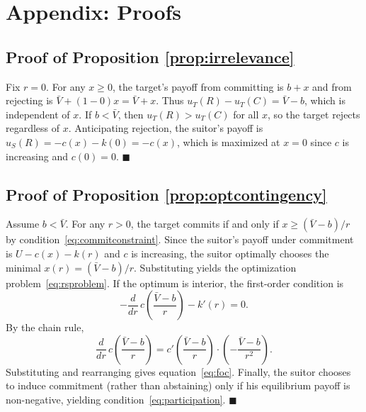 \documentclass[AER]{AEA}
\newcommand{\qed}{\nolinebreak\hfill\ensuremath{\blacksquare}\par}
\DeclareRobustCommand{\AERlink}[1]{}
\begin{document}
\DeclareRobustCommand{\AERlink}[1]{\makebox[0pt][r]{\href{#1}{\color{blue}$\blacktriangleright$}\hspace{0.3em}}}




\appendix
\section{Appendix: Proofs}



\subsection{Proof of Proposition \ref{prop:irrelevance}}

Fix $r=0$.
For any $x\ge 0$, the target's payoff from committing is $b+x$ and from rejecting is $\bar{V}+(1-0)x=\bar{V}+x$.
Thus $u_T(R)-u_T(C)=\bar{V}-b$, which is independent of $x$.
If $b<\bar{V}$, then $u_T(R)>u_T(C)$ for all $x$, so the target rejects regardless of $x$.
Anticipating rejection, the suitor's payoff is $u_S(R)=-c(x)-k(0)=-c(x)$, which is maximized at $x=0$ since $c$ is increasing and $c(0)=0$.
\hfill $\blacksquare$

\subsection{Proof of Proposition \ref{prop:optcontingency}}

Assume $b<\bar{V}$.
For any $r>0$, the target commits if and only if $x\ge (\bar{V}-b)/r$ by condition~\eqref{eq:commitconstraint}.
Since the suitor's payoff under commitment is $U-c(x)-k(r)$ and $c$ is increasing, the suitor optimally chooses the minimal $x(r)=(\bar{V}-b)/r$.
Substituting yields the optimization problem~\eqref{eq:rsproblem}.
If the optimum is interior, the first-order condition is
\[
-\frac{d}{dr}\,c\!\left(\frac{\bar{V}-b}{r}\right) - k'(r) = 0.
\]
By the chain rule,
\[
\frac{d}{dr}\,c\!\left(\frac{\bar{V}-b}{r}\right)
=
c'\!\left(\frac{\bar{V}-b}{r}\right)\cdot\left(-\frac{\bar{V}-b}{r^2}\right).
\]
Substituting and rearranging gives equation~\eqref{eq:foc}.
Finally, the suitor chooses to induce commitment (rather than abstaining) only if his equilibrium payoff is non-negative, yielding condition~\eqref{eq:participation}.
\hfill $\blacksquare$
\end{document}
